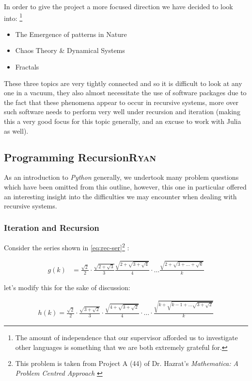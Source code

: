 \documentclass[11pt]{article}
\begin{document}
In order to give the project a more focused direction we have decided to look into: \footnote{The amount of independence that our supervisor afforded us to
investigate other languages is something that we are both extremely grateful for.}

\begin{itemize}
\item The Emergence of patterns in Nature
\item Chaos Theory \& Dynamical Systems
\item Fractals
\end{itemize}

These three topics are very tightly connected and so it is difficult to look at
any one in a vacuum, they also almost necessitate the use of software packages
due to the fact that these phenomena appear to occur in recursive systems, more
over such software needs to perform very well under recursion and iteration
(making this a very good focus for this topic generally, and an excuse to work
with Julia as well).

\subsection{Programming Recursion\hfill{}\textsc{Ryan}}
\label{sec:orgf4f6076}
As an introduction to \emph{Python} generally, we undertook many problem questions which have been omitted from this outline, however, this one in particular offered an interesting insight into the difficulties we may encounter when dealing with recursive systems.
\subsubsection{Iteration and Recursion}
\label{series-and-recursion}
Consider the series shown in \eqref{eq:rec-ser}\footnote{This problem is taken from Project A (44) of Dr. Hazrat's \emph{Mathematica: A Problem Centred Approach} \cite{hazratMathematicaProblemCenteredApproach2015}} :

\begin{align}
    g\left( k \right) &=  \frac{\sqrt{2} }{2} \cdot   \frac{\sqrt{2+  \sqrt{3}}  }{3} \frac{\sqrt{2 +  \sqrt{3 +  \sqrt{4} } } }{4} \cdot  \ldots \frac{\sqrt{2 +  \sqrt{3 +  \ldots +  \sqrt{k} } } }{k} \label{eq:rec-ser}
\end{align}

let's modify this for the sake of discussion:

\begin{align}
h\left( k \right) = \frac{\sqrt{2}  }{2} \cdot  \frac{\sqrt{3 +  \sqrt{2} } }{3} \cdot  \frac{\sqrt{4 +  \sqrt{3 +  \sqrt{2} } } }{4} \cdot  \ldots \cdot  \frac{\sqrt{k +  \sqrt{k - 1 +  \ldots \sqrt{3 + \sqrt{2}  } } } }{k} \label{eq:rec-ser-mod}
\end{align}
\end{document}
